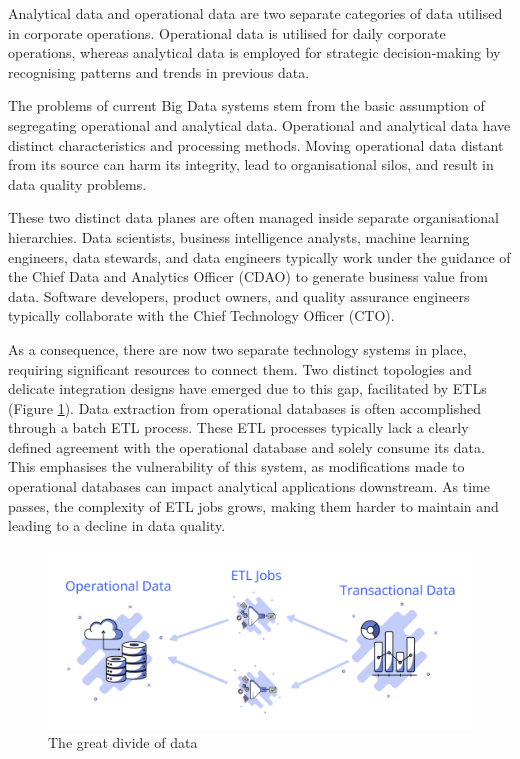 \documentclass[journal]{IEEEtran}
\begin{document}
Analytical data and operational data are two separate categories of data utilised in corporate operations. Operational data is utilised for daily corporate operations, whereas analytical data is employed for strategic decision-making by recognising patterns and trends in previous data.

The problems of current Big Data systems stem from the basic assumption of segregating operational and analytical data. Operational and analytical data have distinct characteristics and processing methods. Moving operational data distant from its source can harm its integrity, lead to organisational silos, and result in data quality problems. 

These two distinct data planes are often managed inside separate organisational hierarchies. Data scientists, business intelligence analysts, machine learning engineers, data stewards, and data engineers typically work under the guidance of the Chief Data and Analytics Officer (CDAO) to generate business value from data. Software developers, product owners, and quality assurance engineers typically collaborate with the Chief Technology Officer (CTO).

As a consequence, there are now two separate technology systems in place, requiring significant resources to connect them. Two distinct topologies and delicate integration designs have emerged due to this gap, facilitated by ETLs (Figure \ref{fig:dataPlanes}). Data extraction from operational databases is often accomplished through a batch ETL process. These ETL processes typically lack a clearly defined agreement with the operational database and solely consume its data. This emphasises the vulnerability of this system, as modifications made to operational databases can impact analytical applications downstream. As time passes, the complexity of ETL jobs grows, making them harder to maintain and leading to a decline in data quality. 

\begin{figure}[h]
  \centering
  \includegraphics[width=\linewidth]{images/data-planes.png}
  \caption{The great divide of data}
  \label{fig:dataPlanes}
\end{figure}
\end{document}

